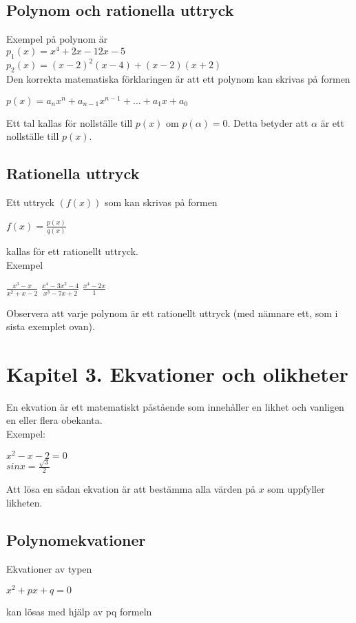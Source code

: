 \documentclass[11pt]{article}
\begin{document}
\subsection{Polynom och rationella uttryck}
Exempel på polynom är \\
$p_1(x) = x^4 +2x -12x-5$ \\
$p_2(x) = (x-2)^2(x-4) + (x-2)(x+2)$ \\
Den korrekta matematiska förklaringen är att ett polynom kan skrivas på formen 
\begin{center}
$p(x) = a_n x^n + a_{n-1}x^{n-1} + \dots + a_1x + a_0 $
\end{center}
Ett tal kallas för nollställe till $p(x)$ om $p(\alpha) = 0$. Detta betyder att $\alpha$ är ett nollställe till $p(x)$. 
\subsection{Rationella uttryck}
Ett uttryck $(f(x))$ som kan skrivas på formen 
\begin{center}
$f(x) = \frac{p(x)}{q(x)} $
\end{center}
kallas för ett rationellt uttryck. \\
Exempel 
\begin{center}
$ \frac{x^3-x}{x^2 + x -2}$ $\frac{x^4-3x^2 -4}{x^3-7x+2}$ $\frac{x^4 - 2 x}{1}$
\end{center}
Observera att varje polynom är ett rationellt uttryck (med nämnare ett, som i sista exemplet ovan).  
\section{Kapitel 3. Ekvationer och olikheter}
En ekvation är ett matematiskt påstående som innehåller en likhet och vanligen en eller flera obekanta. \\
Exempel: 
\begin{center}
$x^2 -x - 2 = 0$ \\
$sinx = \frac{\sqrt{3}}{2} $
\end{center}
Att lösa en sådan ekvation är att bestämma alla värden på $x$ som uppfyller likheten. 
\subsection{Polynomekvationer}
Ekvationer av typen 
\begin{center}
$x^2 + px + q = 0$ 
\end{center}
kan lösas med hjälp av pq formeln 
\begin{center}
\end{center}
\end{document}
